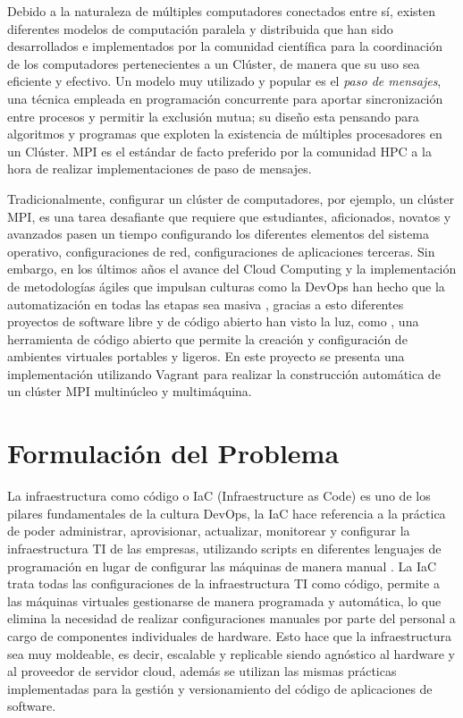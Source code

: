 \documentclass[letterpaper, 12pt, oneside]{article}
\begin{document}
	Debido a la naturaleza de múltiples computadores conectados entre sí, existen diferentes modelos de computación paralela y distribuida que han sido desarrollados e implementados por la comunidad científica para la coordinación de los computadores pertenecientes a un Clúster, de manera que su uso sea eficiente y efectivo. Un modelo muy utilizado y popular es el \textit{paso de mensajes}, una técnica empleada en programación concurrente para aportar sincronización entre procesos y permitir la exclusión mutua; su diseño esta pensando para algoritmos y programas que exploten la existencia de múltiples procesadores en un Clúster. MPI es el estándar de facto preferido por la comunidad HPC a la hora de realizar implementaciones de paso de mensajes.

    Tradicionalmente, configurar un clúster de computadores, por ejemplo, un clúster MPI, es una tarea desafiante que requiere que estudiantes, aficionados, novatos y avanzados pasen un tiempo configurando los diferentes elementos del sistema operativo, configuraciones de red, configuraciones de aplicaciones terceras. Sin embargo, en los últimos años el avance del Cloud Computing y la implementación de metodologías ágiles que impulsan culturas como la DevOps han hecho que la automatización en todas las etapas sea masiva  \cite{devopsH2} \cite{devopsH3} , gracias a esto  diferentes proyectos de software libre y de código abierto han visto la luz, como , una herramienta de código abierto que permite la creación y configuración de ambientes virtuales portables y ligeros. En este proyecto se presenta una implementación utilizando Vagrant para realizar  la construcción automática de un clúster MPI multinúcleo y multimáquina.
    
    \section{Formulación del Problema}
    
    La infraestructura como código o IaC (Infraestructure as Code) es uno de los pilares fundamentales de la cultura DevOps, la IaC hace referencia a la práctica de poder administrar, aprovisionar, actualizar, monitorear y configurar la infraestructura TI de las empresas, utilizando scripts en diferentes lenguajes de programación en lugar de configurar las máquinas de manera manual\cite{devopsH4} \cite{iac}. La IaC trata todas las configuraciones de la infraestructura TI como código, permite a las máquinas virtuales gestionarse de manera programada y automática, lo que elimina la necesidad de realizar configuraciones manuales por parte del personal a cargo de componentes individuales de hardware. Esto hace que la infraestructura sea muy moldeable, es decir, escalable y replicable siendo agnóstico al hardware y al proveedor de servidor cloud, además se utilizan las mismas prácticas implementadas para la gestión y versionamiento del código de aplicaciones de software. 
\end{document}
